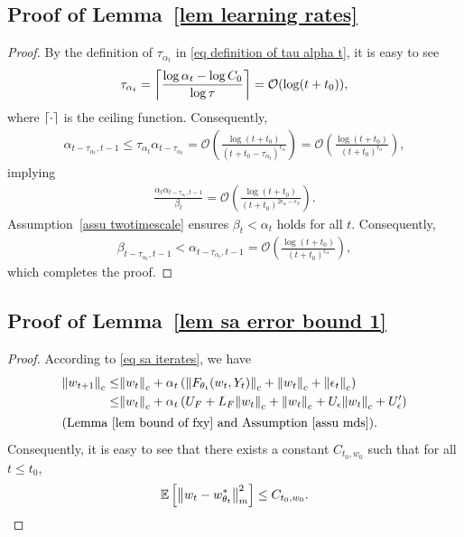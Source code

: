 \documentclass[twoside,11pt]{article}
\DeclarePairedDelimiter{\ceil}{\lceil}{\rceil}
\newcommand{\fO}{\mathcal{O}}
\newcommand{\E}{\mathbb{E}}
\numberwithin{assucounter}{section}
\begin{document}
\subsection{Proof of Lemma~\ref{lem learning rates}}
\label{sec proof lem learning rates}
\lemlearningrates*
\begin{proof}
  By the definition of $\tau_{\alpha_t}$ in \eqref{eq definition of tau alpha t},
  it is easy to see
  \begin{align}
    \tau_{\alpha_t} = \ceil*{\frac{\log \alpha_t - \log C_0}{\log \tau}} = \fO(\log (t+t_0)),
  \end{align}
  where $\ceil{\cdot}$ is the ceiling function.
  Consequently,
  \begin{align}
    \alpha_{t-{\tau_{\alpha_t}}, t-1} \leq \tau_{\alpha_t} \alpha_{t-\tau_{\alpha_t}} = \fO\left(\frac{\log (t+t_0)}{(t+t_0 - \tau_{\alpha_t})^{\epsilon_\alpha}}\right) = \fO\left(\frac{\log (t+t_0)}{(t+t_0)^{\epsilon_\alpha}}\right),
  \end{align}
  implying
  \begin{align}
    \frac{\alpha_t \alpha_{t-{\tau_{\alpha_t}}, t-1}}{\beta_t} = \fO\left(\frac{\log (t+t_0)}{(t+t_0)^{2\epsilon_\alpha - \epsilon_\beta}}\right).
  \end{align}
  Assumption~\ref{assu twotimescale} ensures $\beta_t < \alpha_t$ holds for all $t$.
  Consequently,
  \begin{align}
    \beta_{t-{\tau_{\alpha_t}}, t-1} < \alpha_{t-{\tau_{\alpha_t}}, t-1} = \fO\left(\frac{\log (t+t_0)}{(t+t_0)^{\epsilon_\alpha}}\right),
  \end{align}
  which completes the proof.
\end{proof}

\subsection{Proof of Lemma~\ref{lem sa error bound 1}}
\label{sec proof lem sa error bound 1}
\lemsaerrorboundone*
\begin{proof}
  According to \eqref{eq sa iterates},
  we have
  \begin{align}
    \norm{w_{t+1}}_c \leq& \norm{w_t}_c + \alpha_t \left( \norm{F_{\theta_t}(w_t, Y_t)}_c + \norm{w_t}_c + \norm{\epsilon_t}_c \right) \\
    \leq& \norm{w_t}_c + \alpha_t \left(U_F + L_F \norm{w_t}_c + \norm{w_t}_c + U_\epsilon \norm{w_t}_c + U_\epsilon' \right) \\
    \intertext{\hfill(Lemma~\ref{lem bound of fxy} and Assumption~\ref{assu mds}).}
  \end{align}
  Consequently,
  it is easy to see that there exists a constant $C_{t_0, w_0}$ such that
  for all $t \leq t_0$,
  \begin{align}
    \E\left[\norm{w_{t} - w^*_{\theta_{t}}}_m^2\right] \leq C_{t_0, w_0}.
  \end{align}
\end{proof}
\end{document}
